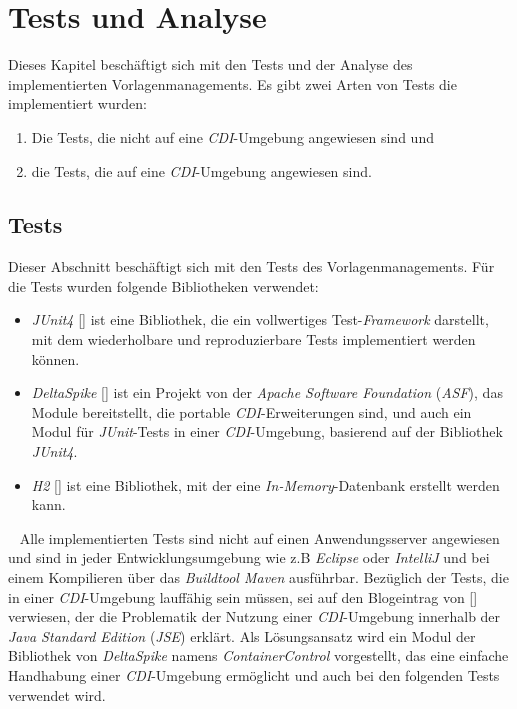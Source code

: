 \chapter{Tests und Analyse}
\label{cha:Analyse}
Dieses Kapitel beschäftigt sich mit den Tests und der Analyse des implementierten Vorlagenmanagements. Es gibt zwei Arten von Tests die implementiert wurden:
\begin{enumerate}
	\item Die Tests, die nicht auf eine \emph{CDI}-Umgebung angewiesen sind und 
	\item die Tests, die auf eine \emph{CDI}-Umgebung angewiesen sind.
\end{enumerate}

\section{Tests}
\label{sec:Tests}
Dieser Abschnitt beschäftigt sich mit den Tests des Vorlagenmanagements. Für die Tests wurden folgende Bibliotheken verwendet:
\begin{itemize}
	\item\emph{JUnit4} [\cite{junit4}] ist eine Bibliothek, die ein vollwertiges Test-\emph{Framework} darstellt, mit dem wiederholbare und reproduzierbare Tests implementiert werden können.
	\item\emph{DeltaSpike} [\cite{deltaspike}] ist ein Projekt von der \emph{Apache Software Foundation} (\emph{ASF}), das Module bereitstellt, die portable \emph{CDI}-Erweiterungen sind, und auch ein Modul für \emph{JUnit}-Tests in einer \emph{CDI}-Umgebung, basierend auf der Bibliothek \emph{JUnit4}.
	\item\emph{H2} [\cite{h2}] ist eine Bibliothek, mit der eine \emph{In-Memory}-Datenbank erstellt werden kann.  
\end{itemize}
\ \newline
Alle implementierten Tests sind nicht auf einen Anwendungsserver angewiesen und sind in jeder Entwicklungsumgebung wie z.B \emph{Eclipse} oder \emph{IntelliJ} und bei einem Kompilieren über das \emph{Buildtool Maven} ausführbar.
\newline
\newline
Bezüglich der Tests, die in einer \emph{CDI}-Umgebung lauffähig sein müssen, sei auf den  Blogeintrag von [\cite{strubergBlog}] verwiesen, der die Problematik der Nutzung einer \emph{CDI}-Umgebung innerhalb der \emph{Java Standard Edition} (\emph{JSE}) erklärt. Als Lösungsansatz wird ein Modul der Bibliothek von \emph{DeltaSpike} namens \emph{ContainerControl} vorgestellt, das eine einfache Handhabung einer \emph{CDI}-Umgebung ermöglicht und auch bei den folgenden Tests verwendet wird.
